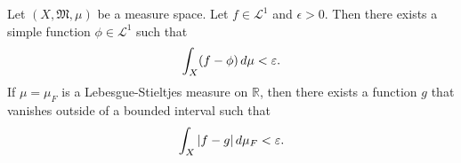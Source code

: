 \documentclass[notoc,notitlepage]{tufte-book}
\begin{document}
\begin{thm}\label{thm:littlewood_s_second_principle_for_a_general_measure}
  Let $(X, \mathfrak{M}, \mu)$ be a measure space.
  Let $f \in \mathcal{L}^1$ and $\epsilon > 0$.
  Then there exists a simple function $\phi \in \mathcal{L}^1$ such that
  \begin{equation*}
    \int_X (f - \phi) \mathop{}\!d{\mu} < \varepsilon.
  \end{equation*}
  If $\mu = \mu_F$ is a Lebesgue-Stieltjes measure on $\mathbb{R}$,
  then there exists a function $g$ that vanishes outside of a bounded interval
  such that
  \begin{equation*}
    \int_X \left|f - g\right| \mathop{}\!d{\mu_F} < \varepsilon.
  \end{equation*}
\end{thm}
\end{document}
